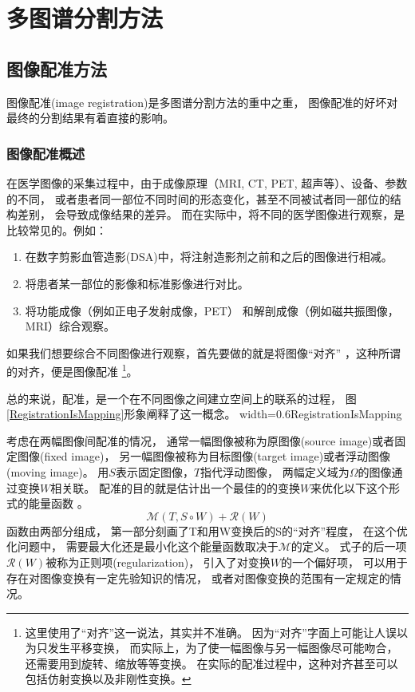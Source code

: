 
\chapter{多图谱分割方法}


\section{图像配准方法}
图像配准(image registration)是多图谱分割方法的重中之重，
图像配准的好坏对最终的分割结果有着直接的影响。

\subsection{图像配准概述}
在医学图像的采集过程中，由于成像原理（MRI, CT, PET, 超声等）、设备、参数的不同，
或者患者同一部位不同时间的形态变化，甚至不同被试者同一部位的结构差别，
会导致成像结果的差异。
而在实际中，将不同的医学图像进行观察，是比较常见的。例如：
\begin{enumerate}
  \item 在数字剪影血管造影(DSA)中，将注射造影剂之前和之后的图像进行相减。
  \item 将患者某一部位的影像和标准影像进行对比。
  \item 将功能成像（例如正电子发射成像，PET）%
    和解剖成像（例如磁共振图像，MRI）综合观察。
\end{enumerate}
如果我们想要综合不同图像进行观察，首先要做的就是将图像``对齐''
，这种所谓的对齐，便是图像配准
\footnote{这里使用了``对齐''这一说法，其实并不准确。
因为``对齐''字面上可能让人误以为只发生平移变换，
而实际上，为了使一幅图像与另一幅图像尽可能吻合，
还需要用到旋转、缩放等等变换。
在实际的配准过程中，这种对齐甚至可以包括仿射变换以及非刚性变换。}。

总的来说，配准，是一个在不同图像之间建立空间上的联系的过程，
图\ref{RegistrationIsMapping}形象阐释了这一概念。
%
{width=0.6\textwidth}{RegistrationIsMapping}

考虑在两幅图像间配准的情况，
通常一幅图像被称为原图像(source image)或者固定图像(fixed image)，
另一幅图像被称为目标图像(target image)或者浮动图像(moving image)。
用$S$表示固定图像，$T$指代浮动图像，
两幅定义域为$\Omega$的图像通过变换$W$相关联。
配准的目的就是估计出一个最佳的的变换$W$来优化以下这个形式的能量函数
。
\begin{equation}\label{LossFunction}
\mathcal{M}(T,S\circ W)+\mathcal{R}(W)
\end{equation}
函数由两部分组成，
第一部分刻画了T和用W变换后的S的``对齐''程度，
在这个优化问题中，
需要最大化还是最小化这个能量函数取决于$\mathcal{M}$的定义。
式子的后一项$\mathcal{R}(W)$被称为正则项(regularization)，
引入了对变换$W$的一个偏好项，
可以用于存在对图像变换有一定先验知识的情况，
或者对图像变换的范围有一定规定的情况。

